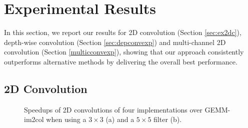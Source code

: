 \section{Experimental Results}
\label{exp} In this section, we report our results for 2D convolution (Section \ref{sec:ex2dc}), depth-wise convolution (Section
\ref{sec:depconvexp}) and multi-channel 2D convolution (Section \ref {multicconvexp}), showing that our approach consistently outperforms
alternative methods by delivering the overall best performance.


\subsection{2D Convolution\label{sec:ex2dc}}
\begin{figure}
\centering
{}
\hspace{0em}

\vspace{-1mm}	\caption{Speedups of 2D convolutions of four implementations over GEMM-im2col when using a $3 \times 3$ (a) and a $5 \times
5$ filter (b).} \label{fig:2druntime} \vspace{-3mm}
\end{figure}


